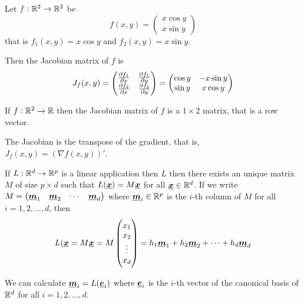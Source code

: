 \documentclass[12pt]{extarticle}
\renewcommand{\vec}[1]{\uvec{#1}}
\begin{document}
\begin{example}
    Let $f: \mathbb{R}^2 \to \mathbb{R}^2$ be
    \begin{equation}
        f(x, y) = \begin{pmatrix}
            x \cos y \\
            x \sin y
        \end{pmatrix}
    \end{equation}
    that is $f_1(x, y) = x \cos y$ and $f_2(x, y) = x \sin y$.

    Then the Jacobian matrix of $f$ is
    \begin{equation}
        J_f(x, y) = \begin{pmatrix}
            \pdv{f_1}{x}\/ & \pdv{f_1}{y}\/ \\
            \pdv{f_2}{x}\/ & \pdv{f_2}{y}\/
        \end{pmatrix} = \begin{pmatrix}
            \cos y & -x \sin y \\
            \sin y & x \cos y
        \end{pmatrix}
    \end{equation}
\end{example}

\begin{example}[Jacobian of $f: \R^2 \to \R$]
    If $f: \R^2 \to \R$ then the Jacobian matrix of $f$ is a $1 \times 2$ matrix, that is a row vector.
\end{example}

\begin{remark}
    The Jacobian is the transpose of the gradient, that is, $J_f(x, y) = \left(\nabla f(x, y)\right)'$.
\end{remark}

\begin{lemma}
    If $L: \mathbb{R}^d \to \mathbb{R}^p$ is a linear application then $L$ then there exists an unique matrix $M$ of size $p \times d$ such that $L(\vec{x}) = M \vec{x}$ for all $\vec{x} \in \R^d$.
    If we write $M = \begin{pmatrix} \vec{m}_1 & \vec{m}_2 & \cdots & \vec{m}_d \end{pmatrix}$ where $\vec{m}_i \in \R^p$ is the $i$-th column of $M$ for all $i = 1, 2, \ldots, d$, then
    \begin{equation}
        L(\vec{x} = M\vec{x} = M \begin{pmatrix}
            x_1    \\
            x_2    \\
            \vdots \\
            x_d
        \end{pmatrix} = h_1 \vec{m}_1 + h_2 \vec{m}_2 + \cdots + h_d \vec{m}_d
    \end{equation}
\end{lemma}
\begin{remark}
    We can calculate $\vec{m}_i = L(\vec{e}_i)$ where $\vec{e}_i$ is the $i$-th vector of the canonical basis of $\mathbb{R}^d$ for all $i = 1, 2, \ldots, d$.
\end{remark}
\end{document}
